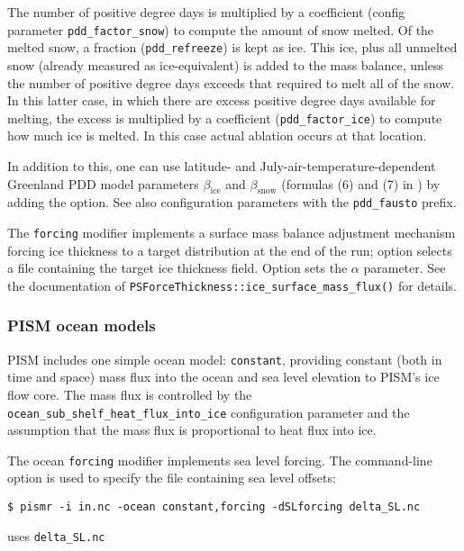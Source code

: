 \begin{itemize}
The number of positive degree days is multiplied by a coefficient (config parameter \texttt{pdd_factor_snow}) to compute the amount of snow melted.  Of the melted snow, a fraction (\texttt{pdd_refreeze}) is kept as ice.  This ice, plus all unmelted snow (already measured as ice-equivalent) is added to the mass balance, unless the number of positive degree days exceeds that required to melt all of the snow.  In this latter case, in which there are excess positive degree days available for melting, the excess is multiplied by a coefficient (\texttt{pdd_factor_ice}) to compute how much ice is melted.  In this case actual ablation occurs at that location.

In addition to this, one can use latitude- and July-air-temperature-dependent Greenland PDD model parameters $\beta_{\mathrm{ice}}$ and $\beta_{\mathrm{snow}}$ (formulas (6) and (7) in \cite{Faustoetal2009}) by adding the   option. See also configuration parameters with the \texttt{pdd_fausto} prefix.

\end{itemize}



The \texttt{forcing} modifier implements a surface mass balance adjustment mechanism forcing ice thickness to a target distribution at the end of the run; option  selects a file containing the target ice thickness field. Option  sets the $\alpha$ parameter. See the documentation  of \texttt{PSForceThickness::ice_surface_mass_flux()} for details.

\subsubsection{PISM ocean models}
\label{sec:pism-ocean-models}

PISM includes one simple ocean model: \texttt{constant}, providing constant (both in time and space) mass flux into the ocean and sea level elevation to PISM's ice flow core. The mass flux is controlled by the\\ \texttt{ocean_sub_shelf_heat_flux_into_ice} configuration parameter and the assumption that the mass flux is proportional to heat flux into ice.

  The ocean \texttt{forcing} modifier implements sea level forcing. The command-line option  is used to specify the file containing sea level offsets:
\begin{verbatim}
$ pismr -i in.nc -ocean constant,forcing -dSLforcing delta_SL.nc
\end{verbatim}%
uses \texttt{delta_SL.nc}

